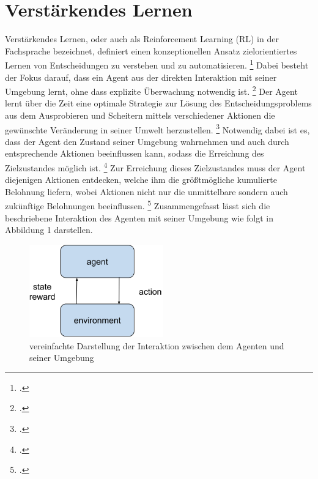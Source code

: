 \section{Verstärkendes Lernen}
Verstärkendes Lernen, oder auch als Reinforcement Learning (RL) in der Fachsprache bezeichnet, definiert einen konzeptionellen Ansatz zielorientiertes Lernen von Entscheidungen zu verstehen und zu automatisieren. \footcite[Vgl.][S. 13]{Sutton.2018}
Dabei besteht der Fokus darauf, dass ein Agent aus der direkten Interaktion mit seiner Umgebung lernt, ohne dass explizite Überwachung notwendig ist. \footcite[Vgl.][S. 13]{Sutton.2018}
Der Agent lernt über die Zeit eine optimale Strategie zur Lösung des Entscheidungsproblems aus dem Ausprobieren und Scheitern mittels verschiedener Aktionen die gewünschte Veränderung in seiner Umwelt herzustellen. \footcite[Vgl.][S. 4]{Li.2019}
Notwendig dabei ist es, dass der Agent den Zustand seiner Umgebung wahrnehmen und auch durch entsprechende Aktionen beeinflussen kann, sodass die Erreichung des Zielzustandes möglich ist. \footcite[Vgl.][S. 2]{Sutton.2018}
Zur Erreichung dieses Zielzustandes muss der Agent diejenigen Aktionen entdecken, welche ihm die größtmögliche kumulierte Belohnung liefern, wobei Aktionen nicht nur die unmittelbare sondern auch zukünftige Belohnungen beeinflussen. \footcite[Vgl.][S. 1]{Sutton.2018}
Zusammengefasst lässt sich die beschriebene Interaktion des Agenten mit seiner Umgebung wie folgt in Abbildung 1 darstellen.
\begin{figure}[htb]
    \centering
    \includegraphics[height=4cm]{lib/graphics/Agent-Environment interaction.png}
    \caption[vereinfachte Darstellung der Interaktion zwischen dem Agenten und seiner Umgebung]{vereinfachte Darstellung der Interaktion zwischen dem Agenten und seiner Umgebung\footnotemark}
    \label{abb:Agent-Environment interaction}
\end{figure}

